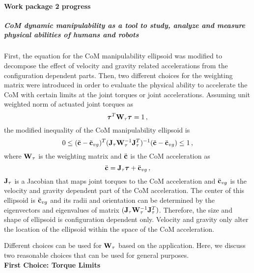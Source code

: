 \paragraph{Work package 2 progress}


\subparagraph*{CoM dynamic manipulability as a tool to study, analyze and measure physical abilities of humans and robots}
First, the equation for the CoM manipulability ellipsoid was modified to decompose the effect of velocity and gravity related accelerations from the configuration dependent parts.  Then, two different
choices for the weighting matrix were introduced in order to evaluate the physical ability to accelerate the CoM with certain limits at the joint torques or joint accelerations.  Assuming unit weighted norm of actuated joint torques as
%
\begin{equation}
\boldsymbol{\tau}^T \mathbf{W}_\tau \boldsymbol{\tau} = 1 \, ,
\label{tauWtau=1}
\end{equation}    
%
the modified inequality of the CoM manipulability ellipsoid is
%
\begin{equation}
0 \le (\ddot{\mathbf{c}} - \ddot{\mathbf{c}}_{vg})^T (\mathbf{J}_\tau \mathbf{W}_\tau^{-1}
\mathbf{J}_\tau^T)^{-1} (\ddot{\mathbf{c}} - \ddot{\mathbf{c}}_{vg}) \le 1 \, ,
\label{torqueellipse}
\end{equation}
%
where $\mathbf{W}_\tau$ is the weighting matrix and $\ddot{\mathbf{c}}$ is the CoM
acceleration as
%
\begin{equation}
\ddot{\mathbf{c}} = \mathbf{J}_\tau \boldsymbol{\tau} + \ddot{\mathbf{c}}_{vg} \, ,
\label{cdd}
\end{equation}
%
$\mathbf{J}_\tau$ is a Jacobian that maps joint torques to the CoM acceleration and
$\ddot{\mathbf{c}}_{vg}$ is the velocity and gravity dependent part of the CoM
acceleration.  The center of this ellipsoid is $\ddot{\mathbf{c}}_{vg}$ and its radii
and orientation can be determined by the eigenvectors and eigenvalues of
matrix $(\mathbf{J}_\tau \mathbf{W}_\tau^{-1} \mathbf{J}_\tau^T)$.  Therefore, the size and shape
of ellipsoid is configuration dependent only.  Velocity and gravity only alter
the location of the ellipsoid within the space of the CoM acceleration.

Different choices can be used for $\mathbf{W}_\tau$ based on the application.  Here,
we discuss two reasonable choices that can be used for general purposes.\\

\textbf{First Choice: Torque Limits}\\

